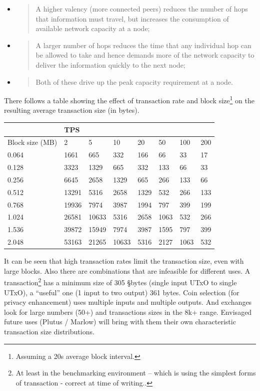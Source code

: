 \documentclass[11pt,a4paper]{article}
\begin{document}
\begin{itemize}
  \begin{itemize}
  \item
    \begin{quote}
    A higher valency (more connected peers) reduces the number of hops
    that information must travel, but increases the consumption of
    available network capacity at a node;
    \end{quote}
  \item
    \begin{quote}
    A larger number of hops reduces the time that any individual hop can
    be allowed to take and hence demands more of the network capacity to
    deliver the information quickly to the next node;
    \end{quote}
  \item
    \begin{quote}
    Both of these drive up the peak capacity requirement at a node.
    \end{quote}
  \end{itemize}
\end{itemize}

There follows a table showing the effect of transaction rate and block
size\footnote{Assuming a 20s average block interval.} on the resulting
average transaction size (in bytes).

\begin{longtable}[]{@{}llllllll@{}}
\toprule
& TPS & & & & & &\tabularnewline
\midrule
\endhead
Block size (MB) & 2 & 5 & 10 & 20 & 50 & 100 & 200\tabularnewline
0.064 & 1661 & 665 & 332 & 166 & 66 & 33 & 17\tabularnewline
0.128 & 3323 & 1329 & 665 & 332 & 133 & 66 & 33\tabularnewline
0.256 & 6645 & 2658 & 1329 & 665 & 266 & 133 & 66\tabularnewline
0.512 & 13291 & 5316 & 2658 & 1329 & 532 & 266 & 133\tabularnewline
0.768 & 19936 & 7974 & 3987 & 1994 & 797 & 399 & 199\tabularnewline
1.024 & 26581 & 10633 & 5316 & 2658 & 1063 & 532 & 266\tabularnewline
1.536 & 39872 & 15949 & 7974 & 3987 & 1595 & 797 & 399\tabularnewline
2.048 & 53163 & 21265 & 10633 & 5316 & 2127 & 1063 & 532\tabularnewline
\bottomrule
\end{longtable}

It can be seen that high transaction rates limit the transaction size,
even with large blocks. Also there are combinations that are infeasible
for different uses. A transaction\footnote{At least in the benchmarking
  environment -- which is using the simplest forms of transaction -
  correct at time of writing..} has a {minimum size of 305 §bytes} (single
input UTxO to single UTxO), a ``useful'' one (1 input to two output) 361
bytes. Coin selection (for privacy enhancement) uses multiple inputs and
multiple outputs. And exchanges look for large numbers (50+) and
transactions sizes in the 8k+ range. Envisaged future uses (Plutus /
Marlow) will bring with them their own characteristic transaction size
distributions.
\end{document}
